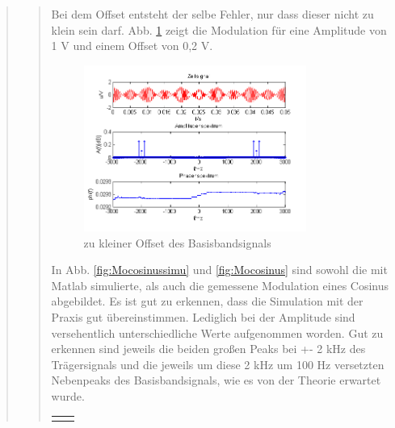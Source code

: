 \begin{quote}
\begin{quote}
	Bei dem Offset entsteht der selbe Fehler, nur dass dieser nicht zu klein
        sein darf. Abb. \ref{fig:Offs} zeigt die Modulation für eine Amplitude
        von 1 V und einem Offset von 0,2 V.
	
	 \begin{figure}[H]
		\begin{center}
			\includegraphics[width=0.8\textwidth]{Bilder/Cos_zukleinerOffset}
		\end{center}
		\caption{zu kleiner Offset des Basisbandsignals}
		\label{fig:Offs}
	\end{figure}
        
        In Abb. \ref{fig:Mocosinussimu} und \ref{fig:Mocosinus} sind sowohl die
        mit Matlab simulierte, als auch die gemessene Modulation eines Cosinus
        abgebildet. Es ist gut zu erkennen, dass die Simulation mit der Praxis
        gut übereinstimmen. Lediglich bei der Amplitude sind versehentlich
        unterschiedliche Werte aufgenommen worden.
        Gut zu erkennen sind jeweils die beiden großen Peaks bei +- 2 kHz des
        Trägersignals und die jeweils um diese 2 kHz um 100 Hz versetzten
        Nebenpeaks des Basisbandsignals, wie es von der Theorie erwartet wurde.  
        
        \begin{center}
        \begin{tabular}{ll}
        
        \hspace{-5cm}
            \begin{minipage}{0.67\textwidth}
                

\end{minipage}
\end{tabular}
\end{center}
\end{quote}
\end{quote}
